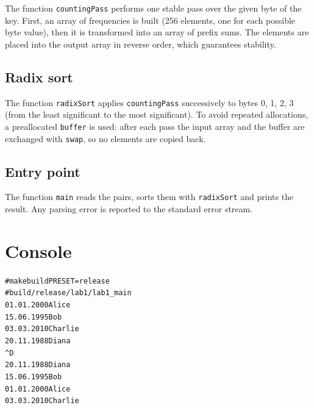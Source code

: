 The function \texttt{countingPass} performs one stable pass over the given byte of the key.
First, an array of frequencies is built (256 elements, one for each possible byte value),
then it is transformed into an array of prefix sums. The elements are placed into the output
array in reverse order, which guarantees stability.

\subsection{Radix sort}

The function \texttt{radixSort} applies \texttt{countingPass} successively to bytes 0, 1, 2, 3
(from the least significant to the most significant). To avoid repeated allocations, a
preallocated \texttt{buffer} is used: after each pass the input array and the buffer are
exchanged with \texttt{swap}, so no elements are copied back.





\subsection{Entry point}

The function \texttt{main} reads the pairs, sorts them with \texttt{radixSort} and prints the
result. Any parsing error is reported to the standard error stream.



\pagebreak

\section{Console}

\begin{alltt}
# make build PRESET=release
# build/release/lab1/lab1_main
01.01.2000    Alice
15.06.1995    Bob
03.03.2010    Charlie
20.11.1988    Diana
^D
20.11.1988    Diana
15.06.1995    Bob
01.01.2000    Alice
03.03.2010    Charlie
\end{alltt}

\pagebreak

